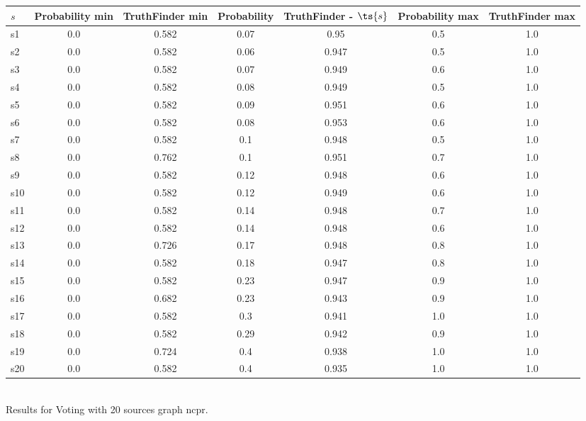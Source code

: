 \documentclass{article}
\begin{document}
\noindent\begin{tabular}{|l|c|c|c|c|c|c|}
\hline
$s$& Probability min & TruthFinder min & Probability & TruthFinder - $\ts{s}$ & Probability max & TruthFinder max\\
\hline
s1 &0.0 & 0.582 & 0.07 & 0.95 & 0.5 & 1.0\\
\hline
s2 &0.0 & 0.582 & 0.06 & 0.947 & 0.5 & 1.0\\
\hline
s3 &0.0 & 0.582 & 0.07 & 0.949 & 0.6 & 1.0\\
\hline
s4 &0.0 & 0.582 & 0.08 & 0.949 & 0.5 & 1.0\\
\hline
s5 &0.0 & 0.582 & 0.09 & 0.951 & 0.6 & 1.0\\
\hline
s6 &0.0 & 0.582 & 0.08 & 0.953 & 0.6 & 1.0\\
\hline
s7 &0.0 & 0.582 & 0.1 & 0.948 & 0.5 & 1.0\\
\hline
s8 &0.0 & 0.762 & 0.1 & 0.951 & 0.7 & 1.0\\
\hline
s9 &0.0 & 0.582 & 0.12 & 0.948 & 0.6 & 1.0\\
\hline
s10 &0.0 & 0.582 & 0.12 & 0.949 & 0.6 & 1.0\\
\hline
s11 &0.0 & 0.582 & 0.14 & 0.948 & 0.7 & 1.0\\
\hline
s12 &0.0 & 0.582 & 0.14 & 0.948 & 0.6 & 1.0\\
\hline
s13 &0.0 & 0.726 & 0.17 & 0.948 & 0.8 & 1.0\\
\hline
s14 &0.0 & 0.582 & 0.18 & 0.947 & 0.8 & 1.0\\
\hline
s15 &0.0 & 0.582 & 0.23 & 0.947 & 0.9 & 1.0\\
\hline
s16 &0.0 & 0.682 & 0.23 & 0.943 & 0.9 & 1.0\\
\hline
s17 &0.0 & 0.582 & 0.3 & 0.941 & 1.0 & 1.0\\
\hline
s18 &0.0 & 0.582 & 0.29 & 0.942 & 0.9 & 1.0\\
\hline
s19 &0.0 & 0.724 & 0.4 & 0.938 & 1.0 & 1.0\\
\hline
s20 &0.0 & 0.582 & 0.4 & 0.935 & 1.0 & 1.0\\
\hline
\end{tabular}\\

\noindent Results for Voting with 20 sources graph ncpr.
\end{document}
